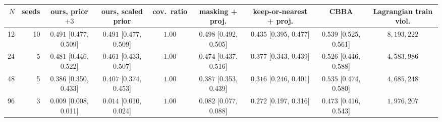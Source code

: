 \begin{tabular}{@{}rrccccccc@{}}
\toprule
$N$ & seeds & ours, prior $+3$ & ours, scaled prior & cov.\ ratio & masking + proj. & keep-or-nearest + proj. & CBBA & Lagrangian train viol.\\
\midrule
12 & 10 & $0.491$ {\scriptsize[0.477, 0.509]} & $0.491$ {\scriptsize[0.477, 0.509]} & $1.00$ & $0.498$ {\scriptsize[0.492, 0.505]} & $0.435$ {\scriptsize[0.395, 0.477]} & $0.539$ {\scriptsize[0.525, 0.561]} & $8{,}193{,}222$ \\
24 & 5 & $0.481$ {\scriptsize[0.446, 0.522]} & $0.461$ {\scriptsize[0.433, 0.507]} & $1.00$ & $0.474$ {\scriptsize[0.437, 0.516]} & $0.377$ {\scriptsize[0.343, 0.439]} & $0.526$ {\scriptsize[0.446, 0.588]} & $4{,}583{,}986$ \\
48 & 5 & $0.386$ {\scriptsize[0.350, 0.433]} & $0.407$ {\scriptsize[0.374, 0.453]} & $1.00$ & $0.387$ {\scriptsize[0.353, 0.439]} & $0.316$ {\scriptsize[0.246, 0.401]} & $0.535$ {\scriptsize[0.474, 0.580]} & $4{,}685{,}248$ \\
96 & 3 & $0.009$ {\scriptsize[0.008, 0.011]} & $0.014$ {\scriptsize[0.010, 0.024]} & $1.00$ & $0.082$ {\scriptsize[0.077, 0.088]} & $0.272$ {\scriptsize[0.197, 0.316]} & $0.473$ {\scriptsize[0.416, 0.543]} & $1{,}976{,}207$ \\
\bottomrule
\end{tabular}
